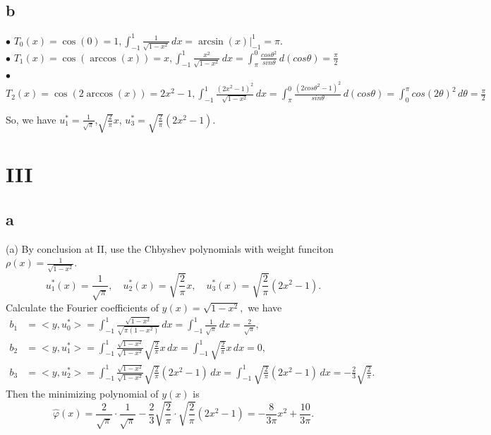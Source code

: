 \documentclass[a4paper]{article}
\begin{document}
\subsection*{b}
\noindent $\bullet$ $T_0(x) = \cos(0) = 1,\int_{-1}^1 \frac{1}{\sqrt{1-x^2}}\, dx=\arcsin(x)|_{-1}^1=\pi.$ \\
\noindent $\bullet$ $T_1(x) = \cos(\arccos(x)) = x,\int_{-1}^1 \frac{x^2}{\sqrt{1-x^2}}\, dx=\int_{\pi}^0 \frac{cos\theta^2}{sin\theta}\, d(cos\theta) = \frac{\pi}{2}$\\
\noindent $\bullet$ $T_2(x) = \cos(2\arccos(x)) = 2x^2-1,\int_{-1}^1 \frac{(2x^2-1)^2}{\sqrt{1-x^2}}\, dx=\int_{\pi}^0 \frac{(2cos\theta^2-1)^2}{sin\theta}\, d(cos\theta)= \int_{0}^\pi cos(2\theta)^2\, d \theta = \frac{\pi}{2}$

So, we have $u_1^{*} = \frac{1}{\sqrt{\pi}}$,$\sqrt{\frac{2}{\pi}}x$, $u_3^* = \sqrt{\frac{2}{\pi}}(2x^2-1)$.

\section*{III}
\subsection*{a}
\noindent (a) By conclusion at II, use the Chbyshev polynomials with weight 
funciton $\rho(x) = \frac{1}{\sqrt{1-x^2}}.$
$$
u_1^*(x) = \frac{1}{\sqrt{\pi}}, \quad
u_2^*(x) = \sqrt{\frac{2}{\pi}}x, \quad
u_3^*(x) = \sqrt{\frac{2}{\pi}}(2x^2-1).
$$
Calculate the Fourier coefficients of $y(x)=\sqrt{1-x^2},$ we have
\begin{align*}
    b_1 & = <y , u_0^*> = \int_{-1}^1 \frac{\sqrt{1-x^2}}{\sqrt{\pi(1-x^2)}} \, dx
    = \int_{-1}^1 \frac{1}{\sqrt{\pi}} \, dx = \frac{2}{\sqrt{\pi}}, \\
    b_2 & = <y , u_1^*> = \int_{-1}^1 \frac{\sqrt{1-x^2}}{\sqrt{1-x^2}} \sqrt{\frac{2}{\pi}}x \,dx
    = \int_{-1}^1 \sqrt{\frac{2}{\pi}}x \, dx = 0, \\
    b_3 & = <y , u_2^*> = \int_{-1}^1 \frac{\sqrt{1-x^2}}{\sqrt{1-x^2}} \sqrt{\frac{2}{\pi}}(2x^2-1) \, dx
    = \int_{-1}^1 \sqrt{\frac{2}{\pi}}(2x^2-1) \, dx = -\frac{2}{3}\sqrt{\frac{2}{\pi}}.
\end{align*}
Then the minimizing polynomial of $y(x)$ is 
$$
\hat{\varphi}(x)=\frac{2}{\sqrt{\pi}}\cdot \frac{1}{\sqrt{\pi}} - \frac{2}{3}\sqrt{\frac{2}{\pi}}\cdot 
\sqrt{\frac{2}{\pi}}(2x^2-1) = -\frac{8}{3\pi}x^2 + \frac{10}{3\pi}.
$$
\end{document}
